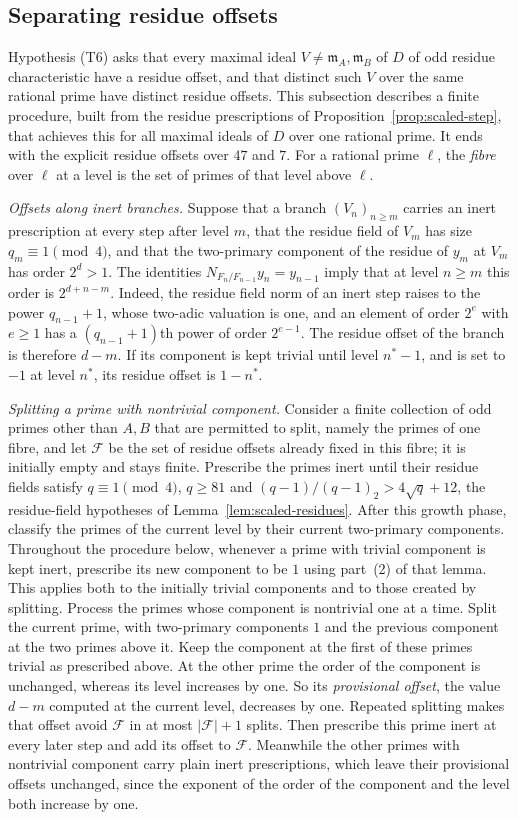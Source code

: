 \documentclass[11pt]{article}
\theoremstyle{plain}
\theoremstyle{definition}
\theoremstyle{remark}
\newcommand{\EA}{\mathfrak m_A}
\newcommand{\EB}{\mathfrak m_B}
\begin{document}
\subsection{Separating residue offsets}\label{sec:offsets}
Hypothesis (T6) asks that every maximal ideal $V\ne\EA,\EB$ of $D$ of odd
residue characteristic have a residue offset, and that distinct such $V$
over the same rational prime have distinct residue offsets.  This subsection describes
a finite procedure, built from the residue prescriptions of
Proposition~\ref{prop:scaled-step}, that achieves this for all maximal
ideals of $D$ over one rational prime.  It ends with the explicit residue offsets
over $47$ and $7$.  For a rational prime $\ell$, the \emph{fibre} over
$\ell$ at a level is the set of primes of that level above $\ell$.

\emph{Offsets along inert branches.}  Suppose that a branch $(V_n)_{n\ge
m}$ carries an inert prescription at every step after level $m$, that the
residue field of $V_m$ has size $q_m\equiv1\pmod4$, and that the
two-primary component of the residue of $y_m$ at $V_m$ has order
$2^d>1$.  The identities $N_{F_n/F_{n-1}}y_n=y_{n-1}$ imply that at level
$n\ge m$ this order is $2^{d+n-m}$.  Indeed, the residue field norm of an
inert step raises to the power $q_{n-1}+1$, whose two-adic valuation is one,
and an element of order $2^{e}$ with $e\ge1$ has a $(q_{n-1}+1)$th power of
order $2^{e-1}$.  The residue offset of the branch is therefore $d-m$.
If its component is kept trivial until level $n^*-1$, and is set to $-1$
at level $n^*$, its residue offset is $1-n^*$.

\emph{Splitting a prime with nontrivial component.}  Consider a finite
collection of odd primes other than $A,B$ that are permitted to split,
namely the primes of one fibre, and let $\mathcal F$ be the set of
residue offsets already fixed in this fibre; it is initially empty and
stays finite.  Prescribe the primes
inert until their residue fields satisfy $q\equiv1\pmod4$, $q\ge81$
and $(q-1)/(q-1)_2>4\sqrt q+12$, the residue-field hypotheses of
Lemma~\ref{lem:scaled-residues}.  After this growth phase, classify the
primes of the current level by their current two-primary components.
Throughout the procedure below, whenever a prime with trivial
component is kept inert, prescribe its new component to be $1$ using
part~(2) of that lemma.  This applies both to the initially trivial
components and to those created by splitting.
Process the primes whose component is nontrivial one at a time.  Split
the current prime, with two-primary
components $1$ and the previous component at the two primes above it.
Keep the component at the first of these primes trivial as prescribed above.  At the
other prime the order of the component is unchanged, whereas its level
increases by one.  So its \emph{provisional offset}, the value $d-m$
computed at the current level, decreases by one.  Repeated splitting
makes that offset avoid $\mathcal F$ in at most $|\mathcal F|+1$ splits.
Then prescribe this prime inert at every later step and add its offset to
$\mathcal F$.  Meanwhile the other primes with nontrivial component carry
plain inert prescriptions, which leave their provisional offsets
unchanged, since the exponent of the order of the component and the level
both increase by one.
\end{document}
